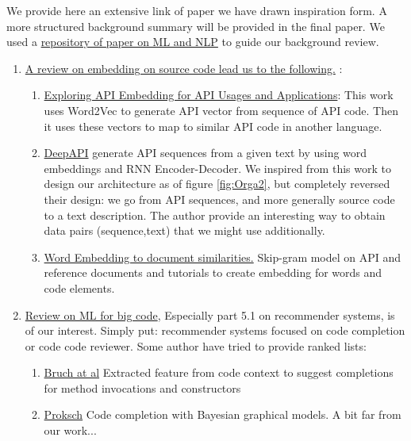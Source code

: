 \documentclass{article}
\begin{document}
\begin{multicols}{2}
We provide here an extensive link of paper we have drawn inspiration form. A more structured background summary will be provided in the final paper.
We used a 
\href{https://ml4code.github.io/}{repository of paper on ML and NLP} to guide our background review.
\begin{enumerate}
    \item \href{https://ml4code.github.io/publications/chen2019literature/}{A review on embedding on source code lead us to the following.} :
        \begin{enumerate}
            \item \href{https://ieeexplore-ieee-org.proxy3.library.mcgill.ca/document/7985683}{Exploring API Embedding for API Usages and Applications}: This work uses Word2Vec to generate API vector from sequence of API code. Then it uses these vectors to map to  similar API code in another language.
            \item \href{https://arxiv.org/pdf/1605.08535.pdf}{DeepAPI} generate API sequences from a given text by using word embeddings and RNN Encoder-Decoder. We inspired from this work to design our architecture as of figure \ref{fig:Orga2}, but completely reversed their design: we go from API sequences, and more generally source code to a text description. The author provide an interesting way to obtain data pairs (sequence,text) that we might use additionally.
            \item \href{https://www.researchgate.net/publication/296526040_From_Word_Embeddings_To_Document_Similarities_for_Improved_Information_Retrieval_in_Software_Engineering}{Word Embedding to document similarities.} Skip-gram model on API and reference documents and tutorials to create embedding for words and code
elements.
        \end{enumerate}
    \item \href{https://miltos.allamanis.com/publicationfiles/allamanis2018survey/allamanis2018survey.pdf}{Review on ML for big code}, Especially part 5.1 on recommender systems, is of our interest. 
    Simply put: recommender systems focused on code completion or code code reviewer. Some author have tried to provide ranked lists:
        \begin{enumerate}
            \item \href{https://hal.archives-ouvertes.fr/hal-01575348/file/Learning-from-Examples-to-Improve-Code-Completion-Systems.pdf}{Bruch at al} Extracted feature from code context to suggest completions for method invocations and constructors
            \item \href{http://www.st.informatik.tu-darmstadt.de/artifacts/pbn/proksch-2015-Intelligent-Code-Completion-with-Bayesian-Networks.pdf}{Proksch} Code completion with Bayesian graphical models. A bit far from our work...

\end{enumerate}
\end{enumerate}
\end{multicols}
\end{document}
